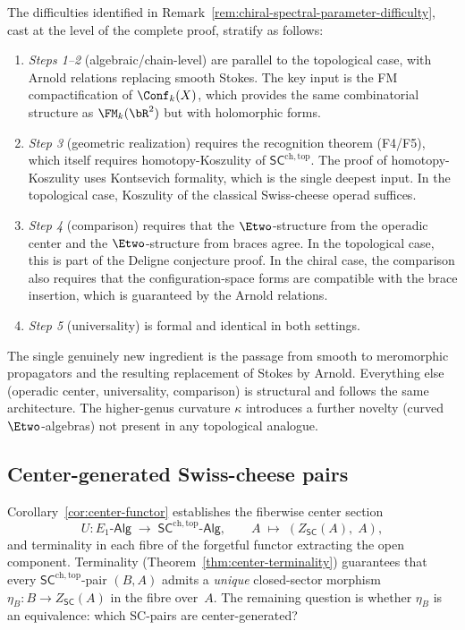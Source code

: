 \begin{remark}
\label{rem:chiral-vs-topological-center}
The difficulties identified in
Remark~\ref{rem:chiral-spectral-parameter-difficulty}, cast at the
level of the complete proof, stratify as follows:
\begin{enumerate}[label=\textup{(\alph*)}]
\item \emph{Steps 1--2} (algebraic/chain-level) are parallel to the
 topological case, with Arnold relations replacing smooth Stokes.
 The key input is the FM compactification of $\Conf_k(X)$, which
 provides the same combinatorial structure as $\FM_k(\bR^2)$ but
 with holomorphic forms.
\item \emph{Step 3} (geometric realization) requires the recognition
 theorem (F4/F5), which itself requires homotopy-Koszulity of
 $\mathsf{SC}^{\mathrm{ch,top}}$. The proof of
 homotopy-Koszulity uses Kontsevich formality, which is the single
 deepest input. In the topological case, Koszulity of the
 classical Swiss-cheese operad suffices.
\item \emph{Step 4} (comparison) requires that the $\Etwo$-structure
 from the operadic center and the $\Etwo$-structure from braces
 agree. In the topological case, this is part of the Deligne
 conjecture proof. In the chiral case, the comparison
 also requires that the configuration-space forms are compatible with the
 brace insertion, which is guaranteed by the Arnold relations.
\item \emph{Step 5} (universality) is formal and identical in both
 settings.
\end{enumerate}
The single genuinely new ingredient is the passage from smooth to
meromorphic propagators and the resulting replacement of Stokes by
Arnold. Everything else (operadic center, universality, comparison)
is structural and follows the same architecture. The higher-genus
curvature $\kappa$ introduces a further novelty (curved
$\Etwo$-algebras) not present in any topological analogue.
\end{remark}


\subsection{Center-generated Swiss-cheese pairs}
\label{subsec:center-essential-surjectivity}

Corollary~\ref{cor:center-functor} establishes the fiberwise center
section
\[
U\colon E_1\text{-}\mathsf{Alg}
\;\longrightarrow\;
\mathsf{SC}^{\mathrm{ch,top}}\text{-}\mathsf{Alg},
\qquad
A \;\longmapsto\; (Z_{\mathsf{SC}}(A),\; A),
\]
and terminality in each fibre of the forgetful functor extracting the
open component. Terminality
(Theorem~\ref{thm:center-terminality}) guarantees that every
$\mathsf{SC}^{\mathrm{ch,top}}$-pair $(B, A)$ admits a
\emph{unique} closed-sector morphism
$\eta_B\colon B \to Z_{\mathsf{SC}}(A)$ in the fibre over~$A$.
The remaining question is whether $\eta_B$ is an equivalence:
which SC-pairs are center-generated?


